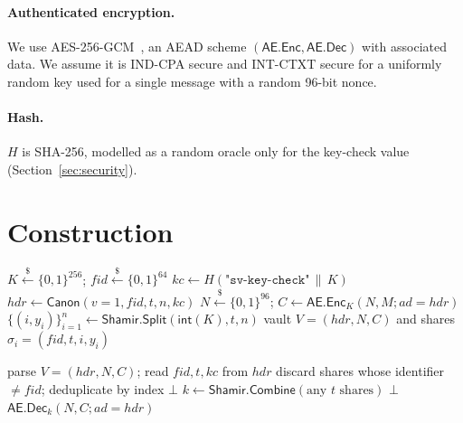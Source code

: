 \documentclass[11pt]{article}
\theoremstyle{definition}
\newcommand{\Enc}{\mathsf{AE.Enc}}
\newcommand{\Dec}{\mathsf{AE.Dec}}
\begin{document}
\paragraph{Authenticated encryption.} We use AES-256-GCM~\cite{gcm}, an AEAD scheme $(\Enc, \Dec)$ with associated data. We assume it is IND-CPA secure and INT-CTXT secure for a uniformly random key used for a single message with a random 96-bit nonce.

\paragraph{Hash.} $H$ is SHA-256, modelled as a random oracle only for the key-check value (Section~\ref{sec:security}).

\section{Construction}\label{sec:construction}
\begin{algorithm}[h]
\caption{$\mathsf{Seal}(M, t, n)$}
\begin{algorithmic}[1]
\State $K \xleftarrow{\$} \{0,1\}^{256}$; \quad $\mathit{fid} \xleftarrow{\$} \{0,1\}^{64}$
\State $\mathit{kc} \gets H(\texttt{"sv-key-check"} \,\|\, K)$
\State $\mathit{hdr} \gets \mathsf{Canon}(v{=}1, \mathit{fid}, t, n, \mathit{kc})$ 
\State $N \xleftarrow{\$} \{0,1\}^{96}$; \quad $C \gets \Enc_K(N, M; \mathit{ad}{=}\mathit{hdr})$
\State $\{(i, y_i)\}_{i=1}^{n} \gets \mathsf{Shamir.Split}(\mathsf{int}(K), t, n)$
\State \Return vault $V = (\mathit{hdr}, N, C)$ and shares $\sigma_i = (\mathit{fid}, t, i, y_i)$
\end{algorithmic}
\end{algorithm}

\begin{algorithm}[h]
\caption{$\mathsf{Open}(V, \{\sigma_i\})$}
\begin{algorithmic}[1]
\State parse $V = (\mathit{hdr}, N, C)$; read $\mathit{fid}, t, \mathit{kc}$ from $\mathit{hdr}$
\State discard shares whose identifier $\neq \mathit{fid}$; deduplicate by index
 \Return $\bot$ \EndIf
\State $k \gets \mathsf{Shamir.Combine}(\text{any } t \text{ shares})$
 \Return $\bot$ \EndIf
\State \Return $\Dec_k(N, C; \mathit{ad}{=}\mathit{hdr})$ 
\end{algorithmic}
\end{algorithm}
\end{document}
